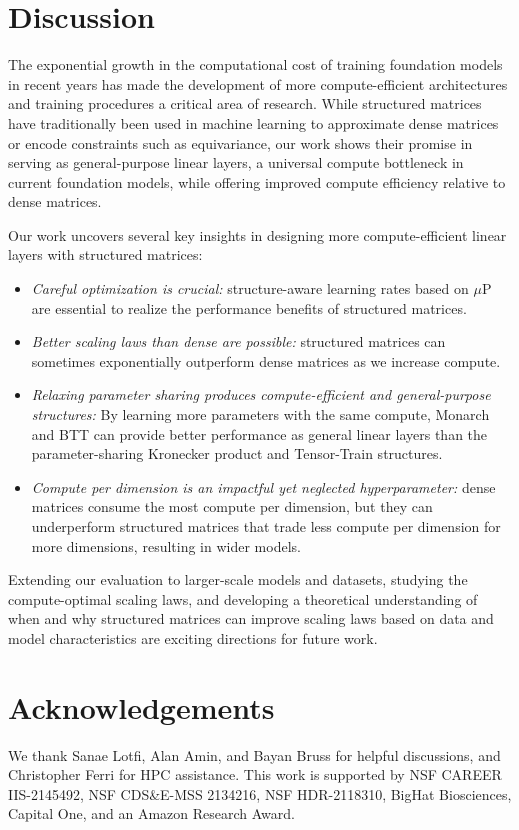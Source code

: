 \documentclass{article}
\theoremstyle{plain}
\theoremstyle{definition}
\theoremstyle{remark}
\newcommand{\mup}{$\mu$P\xspace}
\begin{document}
%

\section{Discussion} \label{sec:discussion} 

The exponential growth in the computational cost of training foundation models in recent years has made the development of more compute-efficient architectures and training procedures a critical area of research. While structured matrices have traditionally been used in machine learning to approximate dense matrices or encode constraints such as equivariance, our work shows their promise in serving as general-purpose linear layers, a universal compute bottleneck in current foundation models, while offering improved compute efficiency relative to dense matrices.

Our work uncovers several key insights in designing more compute-efficient linear layers with structured matrices:
\begin{itemize}
    \item \textit{Careful optimization is crucial:} structure-aware learning rates based on \mup are essential to realize the performance benefits of structured matrices.
    \item \textit{Better scaling laws than dense are possible:} structured matrices can sometimes exponentially outperform dense matrices as we increase compute.
    \item \textit{Relaxing parameter sharing produces compute-efficient and general-purpose structures:} By learning more parameters with the same compute, Monarch and BTT can provide better performance as general linear layers than the parameter-sharing Kronecker product and Tensor-Train structures.
    \item \textit{Compute per dimension is an impactful yet neglected hyperparameter:} dense matrices consume the most compute per dimension, but they can underperform structured matrices that trade less compute per dimension for more dimensions, resulting in wider models.
\end{itemize}

Extending our evaluation to larger-scale models and datasets, studying the compute-optimal scaling laws, and developing a theoretical understanding of when and why structured matrices can improve scaling laws based on data and model characteristics are exciting directions for future work.

\section*{Acknowledgements} We thank Sanae Lotfi, Alan Amin, and Bayan Bruss for helpful discussions, and Christopher Ferri
 for HPC assistance. This work is supported by NSF CAREER IIS-2145492,
NSF CDS\&E-MSS 2134216, NSF HDR-2118310, BigHat Biosciences, Capital One, and an Amazon Research Award.
\end{document}
